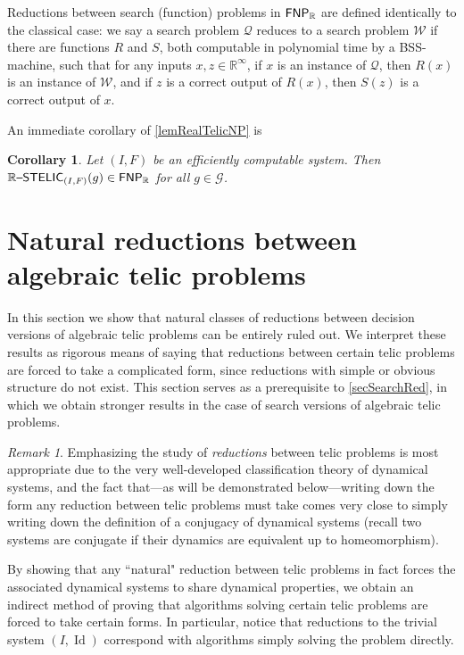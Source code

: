 \documentclass{amsart}
\theoremstyle{theorem}
\newtheorem{corollary}[theorem]{Corollary}
\theoremstyle{remark}
\newtheorem{remark}[theorem]{Remark}
\DeclareMathOperator{\Id}{Id}
\newcommand{\RR}{\mathbb{R}}
\newcommand{\ccFNP}{\textsf{\upshape FNP}}
\newcommand{\ccRSTELIC}{\mathbb{R}\textsf{\upshape --STELIC}}
\newcommand{\cG}{\mathcal{G}}
\newcommand{\cQ}{\mathcal{Q}}
\newcommand{\cW}{\mathcal{W}}
\begin{document}
Reductions between search (function) problems in $\ccFNP_\RR$ are defined identically to the classical case: we say a search problem $\cQ$ reduces to a search problem $\cW$ if there are functions $R$ and $S$, both computable in polynomial time by a BSS-machine, such that for any inputs $x, z \in \RR^\infty$, if $x$ is an instance of $\cQ$, then $R(x)$ is an instance of $\cW$, and if $z$ is a correct output of $R(x)$, then $S(z)$ is a correct output of $x$.

An immediate corollary of \cref{lemRealTelicNP} is
\begin{corollary}
Let $(I, F)$ be an efficiently computable system. Then $\ccRSTELIC_{(I, F)}(g) \in \ccFNP_\RR$ for all $g \in \cG$.
\end{corollary}




\section{Natural reductions between algebraic telic problems}\label{secRealTelicReductions}

In this section we show that natural classes of reductions between decision versions of algebraic telic problems can be entirely ruled out. We interpret these results as rigorous means of saying that reductions between certain telic problems are forced to take a complicated form, since reductions with simple or obvious structure do not exist. This section serves as a prerequisite to \cref{secSearchRed}, in which we obtain stronger results in the case of search versions of algebraic telic problems.

\begin{remark}
Emphasizing the study of \emph{reductions} between telic problems is most appropriate due to the very well-developed classification theory of dynamical systems, and the fact that---as will be demonstrated below---writing down the form any reduction between telic problems must take comes very close to simply writing down the definition of a conjugacy of dynamical systems (recall two systems are conjugate if their dynamics are equivalent up to homeomorphism).

By showing that any ``natural" reduction between telic problems in fact forces the associated dynamical systems to share dynamical properties, we obtain an indirect method of proving that algorithms solving certain telic problems are forced to take certain forms.
In particular, notice that reductions to the trivial system $(I, \Id)$ correspond with algorithms simply solving the problem directly.
\end{remark}
\end{document}
